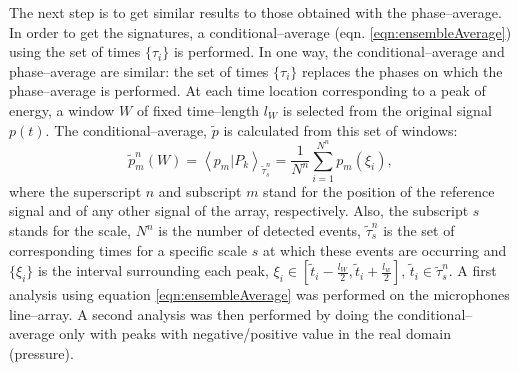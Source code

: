 The next step is to get similar results to those obtained with the phase--average. In order to get the signatures, a conditional--average (eqn. \ref{eqn:ensembleAverage}) using the set of times $\{\tau_{i}\}$ is performed. In one way, the conditional--average and phase--average are similar: the set of times $\{\tau_{i}\}$ replaces the phases on which the phase--average is performed. At each time location corresponding to a peak of energy, a window $W$ of fixed time--length $l_{W}$ is selected from the original signal $p \left( t \right)$. The conditional--average, $\tilde{p}$ is calculated from this set of windows:
\begin{equation} \label{eqn:ensembleAverage}
	\tilde{p}^n_{m}\left( W \right) = \left< p_{m} | P_{k} \right>_{\tilde{\tau}^n_{s}} = \frac{1}{N^n} \sum^{N^n}_{i = 1} p_{m}\left(\xi_{i}\right),
\end{equation}
where the superscript $n$ and subscript $m$ stand for the position of the reference signal and of any other signal of the array, respectively. Also, the subscript $s$ stands for the scale, $N^n$ is the number of detected events, $\tilde{\tau}^n_{s}$ is the set of corresponding times for a specific scale $s$ at which these events are occurring and $\{\xi_{i}\}$ is the interval surrounding each peak, $\xi_{i} \in \left[ \tilde{t}_{i} - \frac{l_W}{2}, \tilde{t}_{i} + \frac{l_w}{2} \right]$, $\tilde{t}_{i} \in \tilde{\tau}^n_{s}$.
A first analysis using equation \ref{eqn:ensembleAverage} was performed on the microphones line--array. A second analysis was then performed by doing the conditional--average only with peaks with negative/positive value in the real domain (pressure).

